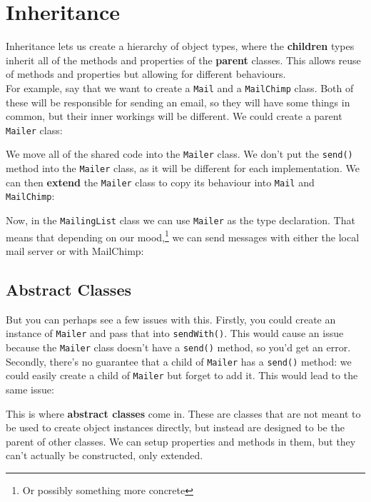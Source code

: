 \section{Inheritance}

Inheritance lets us create a hierarchy of object types, where the \textbf{children} types inherit all of the methods and properties of the \textbf{parent} classes. This allows reuse of methods and properties but allowing for different behaviours.
\\

For example, say that we want to create a \texttt{Mail} and a \texttt{MailChimp} class. Both of these will be responsible for sending an email, so they will have some things in common, but their inner workings will be different. We could create a parent \texttt{Mailer} class:


We move all of the shared code into the \texttt{Mailer} class. We don't put the \texttt{send()} method into the \texttt{Mailer} class, as it will be different for each implementation. We can then \textbf{extend} the \texttt{Mailer} class to copy its behaviour into \texttt{Mail} and \texttt{MailChimp}:


Now, in the \texttt{MailingList} class we can use \texttt{Mailer} as the type declaration. That means that depending on our mood,\footnote{Or possibly something more concrete} we can send messages with either the local mail server or with MailChimp:



\subsection{Abstract Classes}

But you can perhaps see a few issues with this. Firstly, you could create an instance of \texttt{Mailer} and pass that into \texttt{sendWith()}. This would cause an issue because the \texttt{Mailer} class doesn't have a \texttt{send()} method, so you'd get an error. Secondly, there's no guarantee that a child of \texttt{Mailer} has a \texttt{send()} method: we could easily create a child of \texttt{Mailer} but forget to add it. This would lead to the same issue:


This is where \textbf{abstract classes} come in. These are classes that are not meant to be used to create object instances directly, but instead are designed to be the parent of other classes. We can setup properties and methods in them, but they can't actually be constructed, only extended.
\\

